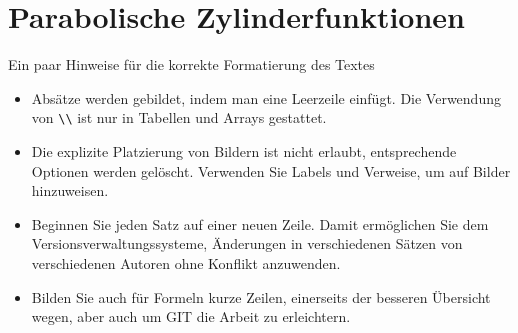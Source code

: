 %
%
%
\chapter{Parabolische Zylinderfunktionen\label{chapter:parzyl}}
\begin{refsection}

Ein paar Hinweise für die korrekte Formatierung des Textes
\begin{itemize}
\item
Absätze werden gebildet, indem man eine Leerzeile einfügt.
Die Verwendung von \verb+\\+ ist nur in Tabellen und Arrays gestattet.
\item
Die explizite Platzierung von Bildern ist nicht erlaubt, entsprechende
Optionen werden gelöscht. 
Verwenden Sie Labels und Verweise, um auf Bilder hinzuweisen.
\item
Beginnen Sie jeden Satz auf einer neuen Zeile. 
Damit ermöglichen Sie dem Versionsverwaltungssysteme, Änderungen
in verschiedenen Sätzen von verschiedenen Autoren ohne Konflikt 
anzuwenden.
\item 
Bilden Sie auch für Formeln kurze Zeilen, einerseits der besseren
Übersicht wegen, aber auch um GIT die Arbeit zu erleichtern.
\end{itemize}






\printbibliography[heading=subbibliography]
\end{refsection}
